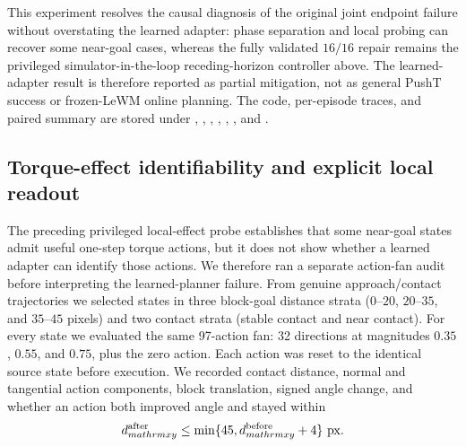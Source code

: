 \documentclass{article}
\begin{document}
This experiment resolves the causal diagnosis of the original joint
endpoint failure without overstating the learned adapter: phase separation
and local probing can recover some near-goal cases, whereas the fully
validated $16/16$ repair remains the privileged simulator-in-the-loop
receding-horizon controller above.  The learned-adapter result is therefore
reported as partial mitigation, not as general PushT success or frozen-LeWM
online planning.  The code, per-episode traces, and paired summary are stored
under
,
,
,
,
,
,
and
.

\subsection{Torque-effect identifiability and explicit local readout}
\label{sec:supp-torque-effect-identifiability}

The preceding privileged local-effect probe establishes that some near-goal
states admit useful one-step torque actions, but it does not show whether a
learned adapter can identify those actions.  We therefore ran a separate
action-fan audit before interpreting the learned-planner failure.  From
genuine approach/contact trajectories we selected states in three block-goal
distance strata ($0$--$20$, $20$--$35$, and $35$--$45$ pixels) and two contact
strata (stable contact and near contact).  For every state we evaluated the
same 97-action fan: 32 directions at magnitudes $0.35$, $0.55$, and $0.75$,
plus the zero action.  Each action was reset to the identical source state
before execution.  We recorded contact distance, normal and tangential action
components, block translation, signed angle change, and whether an action both
improved angle and stayed within
\begin{equation}
 d_{mathrm{xy}}^{\mathrm{after}}
 \leq \min\{45, d_{mathrm{xy}}^{\mathrm{before}}+4\}\ {\rm px}.
\label{eq:supp-torque-identifiability-tube}
\end{equation}
\end{document}
